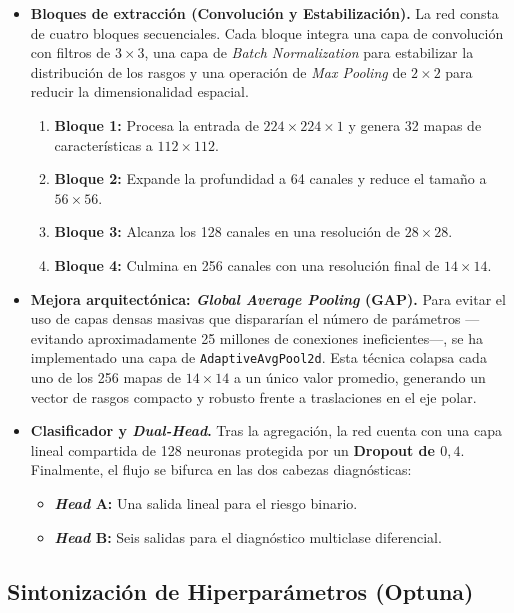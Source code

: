 \begin{itemize}
	\item \textbf{Bloques de extracción (Convolución y Estabilización).} La red consta de cuatro bloques secuenciales. Cada bloque integra una capa de convolución con filtros de $3 \times 3$, una capa de \textit{Batch Normalization} para estabilizar la distribución de los rasgos y una operación de \textit{Max Pooling} de $2 \times 2$ para reducir la dimensionalidad espacial.
	\begin{enumerate}
		\item \textbf{Bloque 1:} Procesa la entrada de $224 \times 224 \times 1$ y genera 32 mapas de características a $112 \times 112$.
		\item \textbf{Bloque 2:} Expande la profundidad a 64 canales y reduce el tamaño a $56 \times 56$.
		\item \textbf{Bloque 3:} Alcanza los 128 canales en una resolución de $28 \times 28$.
		\item \textbf{Bloque 4:} Culmina en 256 canales con una resolución final de $14 \times 14$.
	\end{enumerate}
	
	\item \textbf{Mejora arquitectónica: \textit{Global Average Pooling} (GAP).} Para evitar el uso de capas densas masivas que dispararían el número de parámetros ---evitando aproximadamente 25 millones de conexiones ineficientes---, se ha implementado una capa de \texttt{AdaptiveAvgPool2d}. Esta técnica colapsa cada uno de los 256 mapas de $14 \times 14$ a un único valor promedio, generando un vector de rasgos compacto y robusto frente a traslaciones en el eje polar.
	
	\item \textbf{Clasificador y \textit{Dual-Head}.} Tras la agregación, la red cuenta con una capa lineal compartida de 128 neuronas protegida por un \textbf{Dropout de $0,4$}. Finalmente, el flujo se bifurca en las dos cabezas diagnósticas:
	\begin{itemize}
		\item \textbf{\textit{Head} A:} Una salida lineal para el riesgo binario.
		\item \textbf{\textit{Head} B:} Seis salidas para el diagnóstico multiclase diferencial.
	\end{itemize}
\end{itemize}

\subsection{Sintonización de Hiperparámetros (Optuna)}

